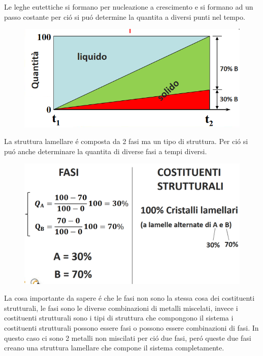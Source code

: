 \documentclass{article}
\begin{document}
{\begin{figure}[!h]
            \end{figure}
            Le leghe eutettiche si formano per nucleazione a crescimento e si formano ad un passo costante per ci\'o si pu\'o determine la quantita a diversi punti nel tempo.
            \begin{figure}[! h]
                \centering
                \includegraphics[width=.85\linewidth]{Cambio nelle fasi prima e dopo la temperatura eutettica in un sistema completamente miscibilie esemplare.png}
            \end{figure}
             La struttura lamellare \'e composta da 2 fasi ma un tipo di struttura. Per ci\'o si pu\'o anche determinare la quantita di diverse fasi a tempi diversi.
             \begin{figure}[!h]
                \centering
                \includegraphics[width=.85\linewidth]{Carcolo di fase e costituenti di una lega eutettica esemplare in un sistema di metalli completamente immiscibili.png}
            \end{figure}
             La cosa importante da sapere \'e che le fasi non sono la stessa cosa dei costituenti strutturali, le fasi sono le diverse combinazioni di metalli miscelati, invece i costituenti strutturali sono i tipi di struttura che compongono il sistema i costituenti strutturali possono essere fasi o possono essere combinazioni di fasi. In questo caso ci sono 2 metalli non miscilati per ci\'o due fasi, per\'o queste due fasi creano una struttura lamellare che compone il sistema completamente.
}
\end{document}
